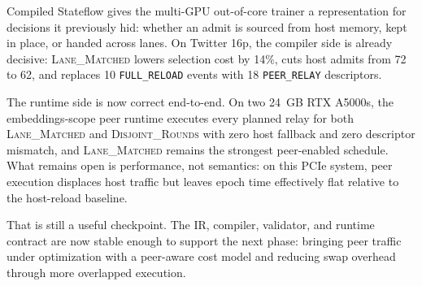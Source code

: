 Compiled Stateflow gives the multi-GPU out-of-core trainer a
representation for decisions it previously hid: whether an admit is
sourced from host memory, kept in place, or handed across lanes. On
Twitter 16p, the compiler side is already decisive:
\textsc{Lane\_Matched} lowers selection cost by 14\%, cuts host admits
from 72 to 62, and replaces 10 \texttt{FULL\_RELOAD} events with 18
\texttt{PEER\_RELAY} descriptors.

The runtime side is now correct end-to-end. On two \SI{24}{GB} RTX
A5000s, the embeddings-scope peer runtime executes every planned relay
for both \textsc{Lane\_Matched} and \textsc{Disjoint\_Rounds} with zero
host fallback and zero descriptor mismatch, and
\textsc{Lane\_Matched} remains the strongest peer-enabled schedule.
What remains open is performance, not semantics: on this PCIe system,
peer execution displaces host traffic but leaves epoch time effectively
flat relative to the host-reload baseline.

That is still a useful checkpoint. The IR, compiler, validator, and
runtime contract are now stable enough to support the next phase:
bringing peer traffic under optimization with a peer-aware cost model
and reducing swap overhead through more overlapped execution.
